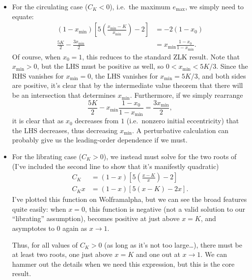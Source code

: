 \documentclass[12pt]{article}
\newcommand*{\p}[1]{\left(#1\right)}
\newcommand*{\s}[1]{\left[#1\right]}
\begin{document}
\begin{itemize}
    \item For the circulating case ($C_K < 0$), i.e.\ the maximum $e_{\max}$, we
        simply need to equate:
        \begin{align}
            \p{1 - x_{\min}}\s{5\p{\frac{x_{\min} - K}{x_{\min}}} - 2}
                &= -2\p{1 - x_0}\nonumber\\
            \frac{5K}{2} - \frac{3x_{\min}}{2}
                &= x_{\min}\frac{1 - x_0}{1 - x_{\min}}.
        \end{align}
        Of course, when $x_0 = 1$, this reduces to the standard ZLK result.
        Note that $x_{\min} > 0$, but the LHS must be positive as well, so $0 <
        x_{\min} < 5K/3$. Since the RHS vanishes for $x_{\min} = 0$, the LHS
        vanishes for $x_{\min} = 5K/3$, and both sides are positive, it's clear
        that by the intermediate value theorem that there will be an
        intersection that determines $x_{\min}$.
        Furthermore, if we simply rearrange
        \begin{equation}
            \frac{5K}{2} - x_{\min}\frac{1 - x_0}{1 - x_{\min}}
                = \frac{3x_{\min}}{2},
        \end{equation}
        it is clear that as $x_0$ decreases from $1$ (i.e.\ nonzero initial
        eccentricity) that the LHS decreases, thus decreasing $x_{\min}$. A
        perturbative calculation can probably give us the leading-order
        dependence if we must.

    \item For the librating case ($C_K > 0$), we instead must solve for the two
        roots of (I've included the second line to show that it's manifestly
        quadratic)
        \begin{align}
            C_K &= \p{1 - x}\s{5\p{\frac{x - K}{x}} - 2}\nonumber\\
            C_Kx &= \p{1 - x}\s{5\p{x - K} - 2x}.\label{eq:lib_cond}
        \end{align}
        I've plotted this function on Wolframalpha, but we can see the broad
        features quite easily: when $x = 0$, this function is negative (not a
        valid solution to our ``librating'' assumption), becomes positive at
        just above $x = K$, and asymptotes to $0$ again as $x \to 1$.

        Thus, for all values of $C_K > 0$ (as long as it's not too large\dots),
        there must be at least two roots, one just above $x=K$ and one out at $x
        \to 1$.
        We can hammer out the details when we need this expression, but this is
        the core result.
\end{itemize}
\end{document}
